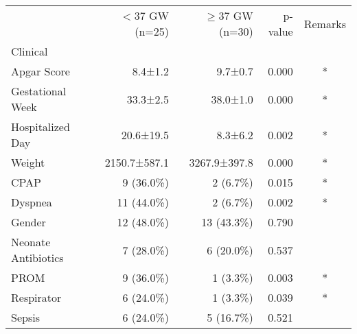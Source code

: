 \begin{tabular}{lrrrc}
\toprule
{} & $<$37 GW (n=25) & $\ge$37 GW (n=30) & p-value & Remarks \\
Clinical            &               &               &         &         \\
\midrule
Apgar Score         &       8.4±1.2 &       9.7±0.7 &   0.000 &       * \\
Gestational Week    &      33.3±2.5 &      38.0±1.0 &   0.000 &       * \\
Hospitalized Day    &     20.6±19.5 &       8.3±6.2 &   0.002 &       * \\
Weight              &  2150.7±587.1 &  3267.9±397.8 &   0.000 &       * \\
CPAP                &     9 (36.0\%) &      2 (6.7\%) &   0.015 &       * \\
Dyspnea             &    11 (44.0\%) &      2 (6.7\%) &   0.002 &       * \\
Gender              &    12 (48.0\%) &    13 (43.3\%) &   0.790 &         \\
Neonate Antibiotics &     7 (28.0\%) &     6 (20.0\%) &   0.537 &         \\
PROM                &     9 (36.0\%) &      1 (3.3\%) &   0.003 &       * \\
Respirator          &     6 (24.0\%) &      1 (3.3\%) &   0.039 &       * \\
Sepsis              &     6 (24.0\%) &     5 (16.7\%) &   0.521 &         \\
\bottomrule
\end{tabular}
